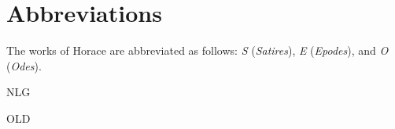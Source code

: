 \chapter{Abbreviations}

The works of Horace are abbreviated as follows: \textit{S} (\textit{Satires}), \textit{E} (\textit{Epodes}), and \textit{O} (\textit{Odes}).

\begin{abbreviations}
    \item[NLG] 
    \item[OLD] 
\end{abbreviations}
